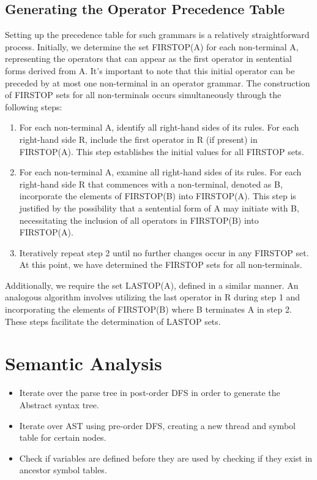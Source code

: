\subsection{Generating the Operator Precedence Table}

Setting up the precedence table for such grammars is a relatively
straightforward process. Initially, we determine the set FIRSTOP(A) for each
non-terminal A, representing the operators that can appear as the first operator
in sentential forms derived from A. It's important to note that this initial
operator can be preceded by at most one non-terminal in an operator grammar. The
construction of FIRSTOP sets for all non-terminals occurs simultaneously through
the following steps:

\begin{enumerate}

	\item For each non-terminal A, identify all right-hand sides of its rules.
	For each right-hand side R, include the first operator in R (if present) in
	FIRSTOP(A). This step establishes the initial values for all FIRSTOP sets.

    \item For each non-terminal A, examine all right-hand sides of its rules.
For each right-hand side R that commences with a non-terminal, denoted as
B, incorporate the elements of FIRSTOP(B) into FIRSTOP(A). This step is
justified by the possibility that a sentential form of A may initiate with B,
necessitating the inclusion of all operators in FIRSTOP(B) into FIRSTOP(A).

    \item Iteratively repeat step 2 until no further changes occur in any
FIRSTOP set. At this point, we have determined the FIRSTOP sets for all
non-terminals.
\end{enumerate}

Additionally, we require the set LASTOP(A), defined in a similar manner. An analogous algorithm involves utilizing the last operator in R during step 1 and incorporating the elements of FIRSTOP(B) where B terminates A in step 2. These steps facilitate the determination of LASTOP sets.



\section{Semantic Analysis}
\begin{itemize}
	\item Iterate over the parse tree in post-order DFS in order to generate the Abstract syntax tree.
	\item Iterate over AST using pre-order DFS, creating a new thread and symbol table for certain nodes.
	\item Check if variables are defined before they are used by checking if they exist in ancestor symbol tables.
\end{itemize}



